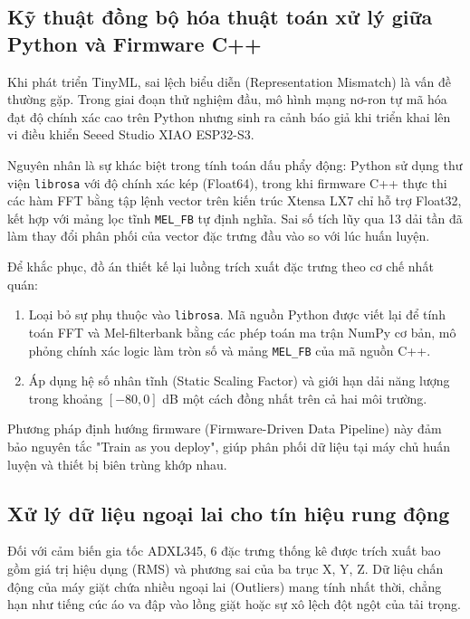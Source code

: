 \subsection{Kỹ thuật đồng bộ hóa thuật toán xử lý giữa Python và Firmware C++}

Khi phát triển TinyML, sai lệch biểu diễn (Representation Mismatch) là vấn đề thường gặp. Trong giai đoạn thử nghiệm đầu, mô hình mạng nơ-ron tự mã hóa đạt độ chính xác cao trên Python nhưng sinh ra cảnh báo giả khi triển khai lên vi điều khiển Seeed Studio XIAO ESP32-S3.

Nguyên nhân là sự khác biệt trong tính toán dấu phẩy động: Python sử dụng thư viện \texttt{librosa} với độ chính xác kép (Float64), trong khi firmware C++ thực thi các hàm FFT bằng tập lệnh vector trên kiến trúc Xtensa LX7 chỉ hỗ trợ Float32, kết hợp với mảng lọc tĩnh \texttt{MEL\_FB} tự định nghĩa. Sai số tích lũy qua 13 dải tần đã làm thay đổi phân phối của vector đặc trưng đầu vào so với lúc huấn luyện.

Để khắc phục, đồ án thiết kế lại luồng trích xuất đặc trưng theo cơ chế nhất quán:

\begin{enumerate}
    \item Loại bỏ sự phụ thuộc vào \texttt{librosa}. Mã nguồn Python được viết lại để tính toán FFT và Mel-filterbank bằng các phép toán ma trận NumPy cơ bản, mô phỏng chính xác logic làm tròn số và mảng \texttt{MEL\_FB} của mã nguồn C++.

    \item Áp dụng hệ số nhân tĩnh (Static Scaling Factor) và giới hạn dải năng lượng trong khoảng $[-80, 0]$ dB một cách đồng nhất trên cả hai môi trường.
\end{enumerate}

Phương pháp định hướng firmware (Firmware-Driven Data Pipeline) này đảm bảo nguyên tắc "Train as you deploy", giúp phân phối dữ liệu tại máy chủ huấn luyện và thiết bị biên trùng khớp nhau.

\subsection{Xử lý dữ liệu ngoại lai cho tín hiệu rung động}

Đối với cảm biến gia tốc ADXL345, 6 đặc trưng thống kê được trích xuất bao gồm giá trị hiệu dụng (RMS) và phương sai của ba trục X, Y, Z. Dữ liệu chấn động của máy giặt chứa nhiều ngoại lai (Outliers) mang tính nhất thời, chẳng hạn như tiếng cúc áo va đập vào lồng giặt hoặc sự xô lệch đột ngột của tải trọng.


